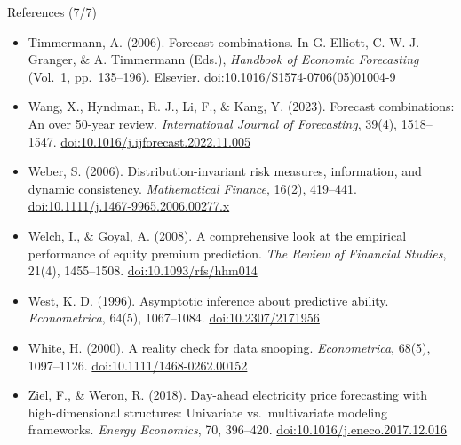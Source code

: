 \begin{frame}{References (7/7)}
\itemsize{\tiny}
\begin{itemize}
    \item Timmermann, A. (2006). Forecast combinations. In G. Elliott, C. W. J. Granger, \& A. Timmermann (Eds.), \textit{Handbook of Economic Forecasting} (Vol.\ 1, pp.\ 135--196). Elsevier. \href{https://doi.org/10.1016/S1574-0706(05)01004-9}{doi:10.1016/S1574-0706(05)01004-9}
    \item Wang, X., Hyndman, R. J., Li, F., \& Kang, Y. (2023). Forecast combinations: An over 50-year review. \textit{International Journal of Forecasting}, 39(4), 1518--1547. \href{https://doi.org/10.1016/j.ijforecast.2022.11.005}{doi:10.1016/j.ijforecast.2022.11.005}
    \item Weber, S. (2006). Distribution-invariant risk measures, information, and dynamic consistency. \textit{Mathematical Finance}, 16(2), 419--441. \href{https://doi.org/10.1111/j.1467-9965.2006.00277.x}{doi:10.1111/j.1467-9965.2006.00277.x}
    \item Welch, I., \& Goyal, A. (2008). A comprehensive look at the empirical performance of equity premium prediction. \textit{The Review of Financial Studies}, 21(4), 1455--1508. \href{https://doi.org/10.1093/rfs/hhm014}{doi:10.1093/rfs/hhm014}
    \item West, K. D. (1996). Asymptotic inference about predictive ability. \textit{Econometrica}, 64(5), 1067--1084. \href{https://doi.org/10.2307/2171956}{doi:10.2307/2171956}
    \item White, H. (2000). A reality check for data snooping. \textit{Econometrica}, 68(5), 1097--1126. \href{https://doi.org/10.1111/1468-0262.00152}{doi:10.1111/1468-0262.00152}
    \item Ziel, F., \& Weron, R. (2018). Day-ahead electricity price forecasting with high-dimensional structures: Univariate vs.\ multivariate modeling frameworks. \textit{Energy Economics}, 70, 396--420. \href{https://doi.org/10.1016/j.eneco.2017.12.016}{doi:10.1016/j.eneco.2017.12.016}
\end{itemize}
\end{frame}


